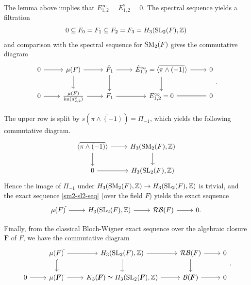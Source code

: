\documentclass[11pt]{amsart}
\theoremstyle{definition}
\theoremstyle{plain}
\numberwithin{equation}{section}
\newcommand{\z}{\mathbb{Z}}
\newcommand{\BB}{\mathcal{B}}
\newcommand{\RB}{\mathcal{RB}}
\newcommand{\lan}{\langle}
\newcommand{\ran}{\rangle}
\newcommand{\SL}{\mathit{{\rm SL}}}
\newcommand{\SM}{\mathit{{\rm SM}}}
\newcommand{\im}{{\rm im}}
\begin{document}
The lemma above implies that $E^{\infty}_{1,2}=E^2_{1,2}=0$. The spectral sequence yields a filtration
\[
    0\subseteq F_0 = F_1\subseteq F_2 = F_3=H_3(\SL_2(F),\z)
\]
and comparison with the spectral sequence for $\SM_2(F)$ gives the commutative diagram
\[
    \begin{tikzcd}
        0\ar[r] & \mu(F)\ar[r]\ar[d] & \hat{F}_1 \ar[r]\ar[d] & \hat{E}^{\infty}_{1,2}=\lan\overline{\pi\wedge(-1)}\ran\ar[r]\ar[d] & 0\\
        0\ar[r] & \frac{\mu(F)}{\im(d^2_{2,2})}\ar[r] & F_1 \ar[r] & E^{\infty}_{1,2}=0\ar[r,equal] & 0
    \end{tikzcd}.
\]

The upper row is split by $s(\overline{\pi\wedge(-1)})=\Pi_{-1}$, which yields the following commutative diagram. 
\[
    \begin{tikzcd}
        \lan\overline{\pi\wedge(-1)}\ran\ar[r]\ar[d] & H_3(\SM_2(F),\z)\ar[d]\\
        0\ar[r] & H_3(\SL_2(F),\z)
    \end{tikzcd}
\]
Hence the image of $\Pi_{-1}$ under $H_3(\SM_2(F),\z)\to H_3(\SL_2(F),\z)$ is trivial, and the exact sequence \eqref{sm2-sl2-seq} (over the field $F$) yields the exact sequence
\[
    \begin{tikzcd}
        \mu(F)^{\tilde{}}\ar[r] & H_3(\SL_2(F),\z)\ar[r] & \RB(F)\ar[r] & 0.
    \end{tikzcd}
\]

Finally, from the classical Bloch-Wigner exact sequence over the algebraic closure $\pmb{F}$ of $F$, we have the commutative diagram
\[
    \begin{tikzcd}
        &\mu(F)^{\tilde{}}\ar[r]\ar[d,hook] & H_3(\SL_2(F),\z)\ar[r]\ar[d] & \RB(F)\ar[r]\ar[d] & 0\\
        0 \ar[r] & \mu(\pmb{F})^{\tilde{}}\ar[r] & K_3(\pmb{F})\simeq H_3(\SL_2(\pmb{F}),\z)\ar[r] & \BB(\pmb{F})\ar[r] & 0
    \end{tikzcd}.
\]
\end{document}
